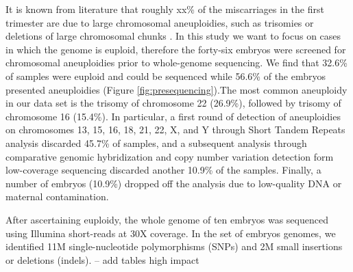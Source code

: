 It is known from literature that roughly xx\% of the miscarriages in the first trimester are due to large chromosomal aneuploidies, such as trisomies or deletions of large chromosomal chunks \cite{goddijn2000genetic,zhang2009genetic}. In this study we want to focus on cases in which the genome is euploid, therefore the forty-six embryos were screened for chromosomal aneuploidies prior to whole-genome sequencing. We find that 32.6\% of samples were euploid and could be sequenced while 56.6\% of the embryos presented aneuploidies (Figure \ref{fig:presequencing}).The most common aneuploidy in our data set is the trisomy of chromosome 22 (26.9\%), followed by trisomy of chromosome 16 (15.4\%). In particular, a first round of detection of aneuploidies on chromosomes 13, 15, 16, 18, 21, 22, X, and Y through Short Tandem Repeats analysis discarded 45.7\% of samples, %
and a subsequent analysis through comparative genomic hybridization and copy number variation detection form low-coverage sequencing discarded another 10.9\% of the samples. Finally, a number of embryos (10.9\%) dropped off the analysis due to low-quality DNA or maternal contamination. 

After ascertaining euploidy, %
the whole genome of ten embryos was sequenced using Illumina short-reads at 30X coverage. In the set of embryos genomes, we identified 11M single-nucleotide polymorphisms (SNPs) and 2M small insertions or deletions (indels).%
-- add tables high impact 

